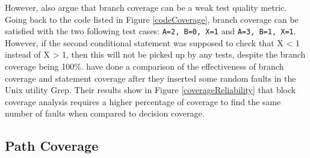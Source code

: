 However, \citet{Myers:2004:AST:983238} also argue that branch coverage can be a weak test quality metric. Going back to the code listed in Figure \ref{codeCoverage}, branch coverage can be satisfied with the two following test cases: \verb+A=2, B=0, X=1+ and \verb+A=3, B=1, X=1+. However, if the second conditional statement was supposed to check that X < 1 instead of X > 1, then this will not be picked up by any tests, despite the branch coverage being 100\%. \citet{497650} have done a comparison of the effectiveness of branch coverage and statement coverage after they inserted some random faults in the Unix utility Grep. Their results show in Figure \ref{coverageReliability} that block coverage analysis requires a higher percentage of coverage to find the same number of faults when compared to decision coverage.

\subsection{Path Coverage}


